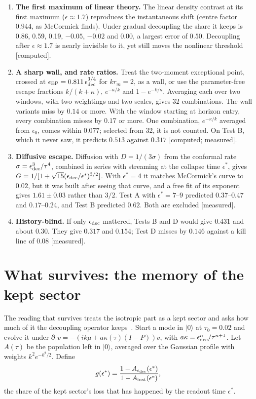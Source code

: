 \documentclass[11pt]{article}
\newcommand{\grade}[1]{\textsf{\small[#1]}}
\begin{document}
\begin{enumerate}
\item \textbf{The first maximum of linear theory.} The linear density contrast at its first maximum ($\epsilon\approx1.7$) reproduces the instantaneous shift (centre factor $0.944$, as McCormick finds). Under gradual decoupling the share it keeps is 0.86, 0.59, 0.19, $-0.05$, $-0.02$ and 0.00, a largest error of $0.50$. Decoupling after $\epsilon\approx1.7$ is nearly invisible to it, yet still moves the nonlinear threshold \grade{computed}.
\item \textbf{A sharp wall, and rate ratios.} Treat the two-moment exceptional point, crossed at $\epsilon_{\rm EP}=0.811\,\epsilon_{\rm dec}^{3/4}$ for $kr_m=2$, as a wall, or use the parameter-free escape fractions $k/(k+\kappa)$, $e^{-\kappa/k}$ and $1-e^{-k/\kappa}$. Averaging each over two windows, with two weightings and two scales, gives 32 combinations. The wall variants miss by $0.14$ or more. With the window starting at horizon entry, every combination misses by $0.17$ or more. One combination, $e^{-\kappa/k}$ averaged from $\epsilon_0$, comes within $0.077$; selected from 32, it is not counted. On Test B, which it never saw, it predicts $0.513$ against $0.317$ \grade{computed; measured}.
\item \textbf{Diffusive escape.} Diffusion with $D=1/(3\sigma)$ from the conformal rate $\sigma=\epsilon_{\rm dec}^3/\tau^4$, combined in series with streaming at the collapse time $\epsilon^\ast$, gives $G=1/[1+\sqrt{15}(\epsilon_{\rm dec}/\epsilon^\ast)^{3/2}]$. With $\epsilon^\ast=4$ it matches McCormick's curve to $0.02$, but it was built after seeing that curve, and a free fit of its exponent gives $1.61\pm0.03$ rather than $3/2$. Test A with $\epsilon^\ast=7$--$9$ predicted $0.37$--$0.47$ and $0.17$--$0.24$, and Test B predicted $0.62$. Both are excluded \grade{measured}.
\item \textbf{History-blind.} If only $\epsilon_{\rm dec}$ mattered, Tests B and D would give $0.431$ and about $0.30$. They give $0.317$ and $0.154$; Test D misses by $0.146$ against a kill line of $0.08$ \grade{measured}.
\end{enumerate}

\section{What survives: the memory of the kept sector}\label{sec:memory}

The reading that survives treats the isotropic part as a kept sector and asks how much of it the decoupling operator keeps~\cite{WB}. Start a mode in $|0\rangle$ at $\tau_0=0.02$ and evolve it under $\partial_\tau v=-(ik\mu+a\kappa(\tau)(I-P))v$, with $a\kappa=\epsilon_{\rm dec}^n/\tau^{n+1}$. Let $A(\tau)$ be the population left in $|0\rangle$, averaged over the Gaussian profile with weights $k^2e^{-k^2/2}$. Define
\begin{equation}
g(\epsilon^\ast)=\frac{1-A_{\epsilon_{\rm dec}}(\epsilon^\ast)}{1-A_{\rm inst}(\epsilon^\ast)},
\end{equation}
the share of the kept sector's loss that has happened by the readout time $\epsilon^\ast$.
\end{document}
